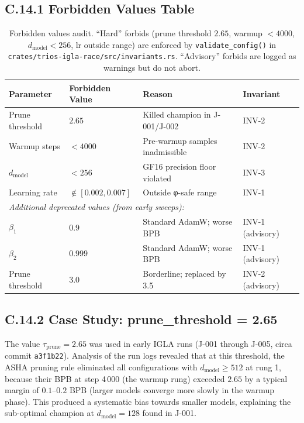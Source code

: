 \subsection*{C.14.1 Forbidden Values Table}

\begin{table}[h]
\centering
\begin{tabular}{llll}
\toprule
\textbf{Parameter} & \textbf{Forbidden Value} & \textbf{Reason} &
\textbf{Invariant} \\
\midrule
Prune threshold    & $2.65$  & Killed champion in J-001/J-002
                             & INV-2 \\
Warmup steps       & $< 4000$& Pre-warmup samples inadmissible
                             & INV-2 \\
$d_\text{model}$   & $< 256$ & GF16 precision floor violated
                             & INV-3 \\
Learning rate      & $\notin [0.002, 0.007]$
                             & Outside φ-safe range
                             & INV-1 \\
\midrule
\multicolumn{4}{l}{\textit{Additional deprecated values (from early sweeps):}} \\
\midrule
$\beta_1$          & $0.9$   & Standard AdamW; worse BPB
                             & INV-1 (advisory) \\
$\beta_2$          & $0.999$ & Standard AdamW; worse BPB
                             & INV-1 (advisory) \\
Prune threshold    & $3.0$   & Borderline; replaced by 3.5
                             & INV-2 (advisory) \\
\bottomrule
\end{tabular}
\caption{Forbidden values audit.  ``Hard'' forbids (prune threshold
$2.65$, warmup $< 4000$, $d_\text{model} < 256$, lr outside range) are
enforced by \texttt{validate\_config()} in
\texttt{crates/trios-igla-race/src/invariants.rs}.
``Advisory'' forbids are logged as warnings but do not abort.}
\end{table}

\subsection*{C.14.2 Case Study: prune\_threshold = 2.65}

The value $\tau_{\text{prune}} = 2.65$ was used in early IGLA runs
(J-001 through J-005, circa commit \texttt{a3f1b22}).  Analysis of the
run logs revealed that at this threshold, the ASHA pruning rule
eliminated all configurations with $d_\text{model} \geq 512$ at rung 1,
because their BPB at step 4\,000 (the warmup rung) exceeded $2.65$
by a typical margin of $0.1$--$0.2$ BPB (larger models converge more
slowly in the warmup phase).  This produced a systematic bias towards
smaller models, explaining the sub-optimal champion at $d_\text{model}
= 128$ found in J-001.

